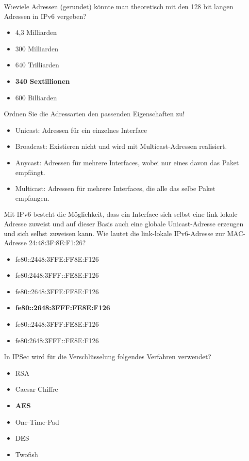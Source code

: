 \documentclass{article}
\begin{document}
	Wieviele Adressen (gerundet) könnte man theoretisch mit den 128 bit langen Adressen in IPv6 vergeben?
	\begin{itemize}
		\item 4,3 Milliarden 
		\item 300 Milliarden 
		\item 640 Trilliarden
		\item \textbf{340 Sextillionen }
		\item 600 Billiarden
	\end{itemize}

	Ordnen Sie die Adressarten den passenden Eigenschaften zu! 
	\begin{itemize}
		\item Unicast: Adressen für ein einzelnes Interface 
		\item Broadcast: Existieren nicht und wird mit Multicast-Adressen realisiert. 
		\item Anycast: Adressen für mehrere Interfaces, wobei nur eines davon das Paket empfängt. 
		\item Multicast: Adressen für mehrere Interfaces, die alle das selbe Paket empfangen. 
	\end{itemize}

	Mit IPv6 besteht die Möglichkeit, dass ein Interface sich selbst eine link-lokale Adresse zuweist und auf dieser Basis auch eine globale Unicast-Adresse erzeugen und sich selbst zuweisen kann. Wie lautet die link-lokale IPv6-Adresse zur MAC-Adresse 24:48:3F:8E:F1:26?
	\begin{itemize}
		\item fe80::2448:3FFE:FF8E:F126
		\item fe80:2448:3FFF::FE8E:F126 
		\item fe80::2648:3FFE:FF8E:F126
		\item \textbf{fe80::2648:3FFF:FE8E:F126 }
		\item fe80::2448:3FFF:FE8E:F126
		\item fe80:2648:3FFF::FE8E:F126 
	\end{itemize} 

	In IPSec wird für die Verschlüsselung folgendes Verfahren verwendet? 
	\begin{itemize}
		\item RSA
		\item Caesar-Chiffre 
		\item \textbf{AES}
		\item One-Time-Pad 
		\item DES
		\item Twofish
	\end{itemize}
\end{document}
